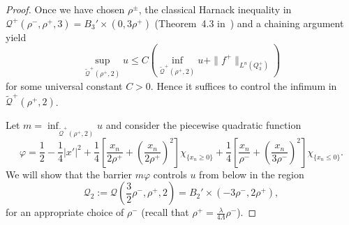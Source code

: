 \documentclass[letter,11pt]{amsart}
\newcommand{\chara}[1]{\chi_{#1}}
\newcommand{\gcal}{\mathcal{Q}}
\theoremstyle{definition}
\numberwithin{equation}{section}
\begin{document}
\begin{proof}
Once we have chosen $\rho^{\pm}$, the classical Harnack inequality in $\gcal^{+}(\rho^{-},\rho^{+},3) = B_3' \times (0, 3\rho^{+})$ (Theorem~4.3 in~\cite{CC}) and a chaining argument yield
\begin{equation}
\label{into}
\sup_{\widetilde{\gcal}^{+}(\rho^{+},2)} u
\leq C \left( \inf_{\widetilde{\gcal}^{+}(\rho^{+},2)} u + \|f^{+}\|_{L^{n}(Q^{+}_3)} \right)
\end{equation}
for some universal constant $C > 0$. 
Hence it suffices to control the infimum in $\widetilde{\gcal}^{+}(\rho^{+},2)$.

\medskip

Let $m = \inf_{\widetilde{\gcal}^{+}(\rho^{+}, 2)} u$ and
consider the piecewise quadratic function
\[
\varphi = \frac{1}{2} 
- \frac{1}{4} |x'|^2
+\frac{1}{4} \left[
\frac{x_n}{2\rho^{+}} 
+ \left( \frac{x_n}{2\rho^{+}}\right)^2
\right] \chara{\{x_n \geq 0\}}
+ \frac{1}{4} \left[
\frac{x_n}{ \rho^{-}}
+  \left( \frac{x_n}{3\rho^{-}}\right)^2
\right] \chara{\{x_n \leq 0\}}.
\]
We will show that the barrier $m\varphi$ controls $u$ from below in the region
\[
\gcal_2 := 
\textstyle\gcal(\frac{3}{2}\rho^{-}, \rho^{+}, 2) 
= B_2' \times (- 3 \rho^{-}, 2 \rho^{+}),
\]
for an appropriate choice of $\rho^{-}$ (recall that $\rho^{+} = \frac{\lambda}{4 \Lambda} \rho^{-}$).

\medskip


\end{proof}
\end{document}
